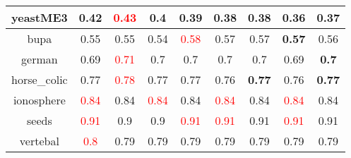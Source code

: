 \documentclass{article}%
\begin{document}
\begin{tabular}{c|cccccccc}
\hline%
yeastME3&0.42&\textcolor{red}{ 
0.43
}&\textbf{0.4}&0.39&0.38&0.38&0.36&\textbf{0.37}\\%
\hline%
bupa&0.55&0.55&0.54&\textcolor{red}{ 
0.58
}&0.57&0.57&\textbf{0.57}&0.56\\%
\hline%
german&0.69&\textcolor{red}{ 
0.71
}&0.7&0.7&0.7&0.7&0.69&\textbf{0.7}\\%
\hline%
horse\_colic&0.77&\textcolor{red}{ 
0.78
}&0.77&0.77&0.76&\textbf{0.77}&0.76&\textbf{0.77}\\%
\hline%
ionosphere&\textcolor{red}{ 
0.84
}&0.84&\textcolor{red}{ 
0.84
}&0.84&\textcolor{red}{ 
0.84
}&0.84&\textcolor{red}{ 
0.84
}&0.84\\%
\hline%
seeds&\textcolor{red}{ 
0.91
}&0.9&0.9&\textcolor{red}{ 
0.91
}&\textcolor{red}{ 
0.91
}&0.91&\textcolor{red}{ 
0.91
}&0.91\\%
\hline%
vertebal&\textcolor{red}{ 
0.8
}&0.79&0.79&0.79&0.79&0.79&0.79&0.79\\%
\hline%
\end{tabular}

%
\end{document}
